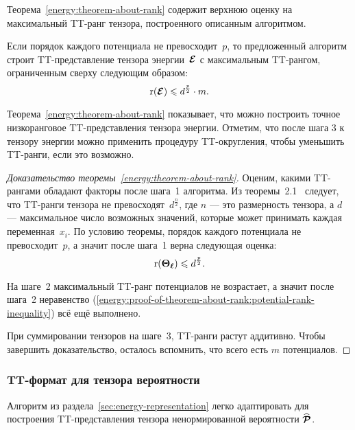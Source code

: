 Теорема~\ref{energy:theorem-about-rank} содержит верхнюю оценку на максимальный TT\hyp{}ранг тензора, построенного описанным алгоритмом.

\begin{theorem}
\label{energy:theorem-about-rank}
Если порядок каждого потенциала не превосходит~$p$, то предложенный алгоритм строит TT\hyp{}представление тензора энергии~$\boldsymbol{\mathcal{E}}$ с максимальным TT\hyp{}рангом, ограниченным сверху следующим образом:
\begin{equation}
\label{energy:theorem-about-rank:inequality}
\operatorname{r}(\boldsymbol{\mathcal{E}}) \leqslant d^{\frac{p}{2}} \cdot m.
\end{equation}
\end{theorem}

Теорема~\ref{energy:theorem-about-rank} показывает, что можно построить точное низкоранговое TT\hyp{}представления тензора энергии. Отметим, что после шага 3 к тензору энергии можно применить процедуру TT\hyp{}округления, чтобы уменьшить TT\hyp{}ранги, если это возможно.

\begin{proof}[Доказательство теоремы~\ref{energy:theorem-about-rank}]
Оценим, какими TT\hyp{}рангами обладают факторы после шага~1 алгоритма.
Из теоремы~2.1~\cite{oseledets2011ttMain} следует, что TT\hyp{}ранги тензора не превосходят~$d^{\frac{n}{2}}$, где $n$ --- это размерность тензора, а $d$ --- максимальное число возможных значений, которые может принимать каждая переменная~$x_i$.
По условию теоремы, порядок каждого потенциала не превосходит~$p$, а значит после шага~1 верна следующая оценка:
\begin{equation}
\label{energy:proof-of-theorem-about-rank:potential-rank-inequality}
\operatorname{r}(\boldsymbol{\Theta_\ell}) \leqslant d^{\frac{p}{2}}.
\end{equation}

На шаге~2 максимальный TT\hyp{}ранг потенциалов не возрастает, а значит после шага~2 неравенство (\ref{energy:proof-of-theorem-about-rank:potential-rank-inequality}) всё ещё выполнено.

При суммировании тензоров на шаге~3, TT\hyp{}ранги растут аддитивно. Чтобы завершить доказательство, осталось вспомнить, что всего есть $m$ потенциалов.
\end{proof}

\subsubsection{TT\hyp{}формат для тензора вероятности}
\label{sec:prob-representation}
Алгоритм из раздела~\ref{sec:energy-representation} легко адаптировать для построения TT\hyp{}представления тензора ненормированной вероятности $\widehat{\boldsymbol{\mathcal{P}}}$.

